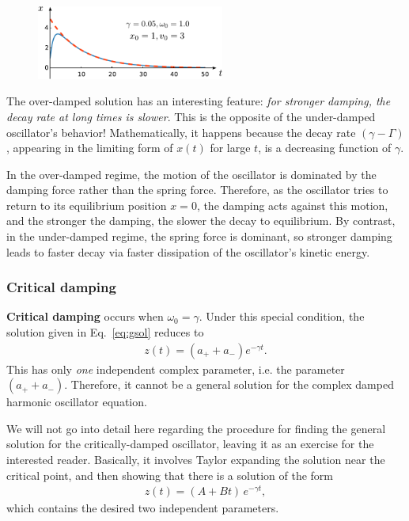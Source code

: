 \documentclass[10pt,a4paper]{article}
\begin{document}
\begin{figure}[ht]
  \centering\includegraphics[width=0.55\textwidth]{overdamped}
\end{figure}

The over-damped solution has an interesting feature: \textit{for
  stronger damping, the decay rate at long times is slower}. This is
the opposite of the under-damped oscillator's behavior!
Mathematically, it happens because the decay rate $(\gamma-\Gamma)$,
appearing in the limiting form of $x(t)$ for large $t$, is a
decreasing function of $\gamma$.

In the over-damped regime, the motion of the oscillator is dominated
by the damping force rather than the spring force. Therefore, as the
oscillator tries to return to its equilibrium position $x = 0$, the
damping acts against this motion, and the stronger the damping, the
slower the decay to equilibrium. By contrast, in the under-damped
regime, the spring force is dominant, so stronger damping leads to
faster decay via faster dissipation of the oscillator's kinetic
energy.

\subsubsection{Critical damping}
\label{critical-damping}

\textbf{Critical damping} occurs when $\omega_0 = \gamma$.  Under this
special condition, the solution given in Eq.~\eqref{eq:gsol} reduces
to
\begin{align}
  z(t) = \left(a_+ + a_-\right) e^{-\gamma t}.
\end{align}
This has only \textit{one} independent complex parameter, i.e. the
parameter $(a_+ + a_-)$.  Therefore, it cannot be a general solution
for the complex damped harmonic oscillator equation.

We will not go into detail here regarding the procedure for finding
the general solution for the critically-damped oscillator, leaving it
as an exercise for the interested reader. Basically, it involves
Taylor expanding the solution near the critical point, and then
showing that there is a solution of the form
\begin{align}
  z(t) = \left(A + B t\right)\, e^{-\gamma t},
  \label{critical-sol}
\end{align}
which contains the desired two independent parameters.
\end{document}
